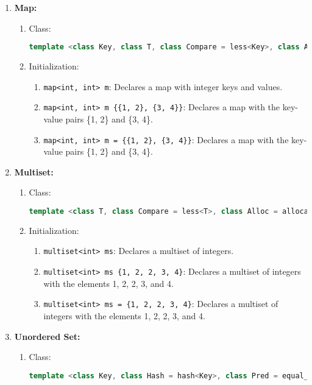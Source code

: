 \begin{enumerate}
\begin{enumerate}
      \item \textbf{Map:}
	\begin{enumerate}
	  \item Class:
	    \begin{lstlisting}[language=C++]
	    template <class Key, class T, class Compare = less<Key>, class Alloc = allocator<pair<const Key, T>>> class map;
	    \end{lstlisting}
	  \item Initialization:
	    \begin{enumerate}
	      \item \texttt{map<int, int> m}: Declares a map with integer keys and values.
	      \item \texttt{map<int, int> m \{\{1, 2\}, \{3, 4\}\}}: Declares a map with the key-value pairs \{1, 2\} and \{3, 4\}.
	      \item \texttt{map<int, int> m = \{\{1, 2\}, \{3, 4\}\}}: Declares a map with the key-value pairs \{1, 2\} and \{3, 4\}.
	    \end{enumerate}
	\end{enumerate}
      \item \textbf{Multiset:}
	\begin{enumerate}
	  \item Class:
	    \begin{lstlisting}[language=C++]
	    template <class T, class Compare = less<T>, class Alloc = allocator<T>> class multiset;
	    \end{lstlisting}
	  \item Initialization:
	    \begin{enumerate}
	      \item \texttt{multiset<int> ms}: Declares a multiset of integers.
	      \item \texttt{multiset<int> ms \{1, 2, 2, 3, 4\}}: Declares a multiset of integers with the elements 1, 2, 2, 3, and 4.
	      \item \texttt{multiset<int> ms = \{1, 2, 2, 3, 4\}}: Declares a multiset of integers with the elements 1, 2, 2, 3, and 4.
	    \end{enumerate}
	\end{enumerate}
      \item \textbf{Unordered Set:}
	\begin{enumerate}
	  \item Class:
	    \begin{lstlisting}[language=C++]
	    template <class Key, class Hash = hash<Key>, class Pred = equal_to<Key>, class Alloc = allocator<Key>> class unordered_set;

\end{lstlisting}
\end{enumerate}
\end{enumerate}
\end{enumerate}
